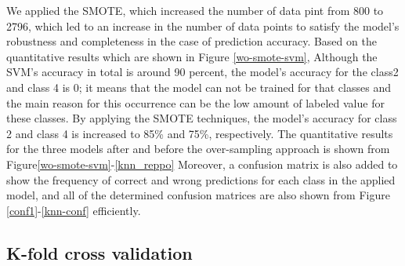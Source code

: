 \documentclass{article}
\begin{document}



We applied the SMOTE, which increased the number of data pint from 800 to 2796, which led to an increase in the number of data points to satisfy the model's robustness and completeness in the case of prediction accuracy. Based on the quantitative results which are shown in Figure \ref{wo-smote-svm}, Although the SVM's accuracy in total is around 90 percent, the model's accuracy for the class2 and class 4 is 0; it means that the model can not be trained for that classes and the main reason for this occurrence can be the low amount of labeled value for these classes. By applying the SMOTE techniques, the model's accuracy for class 2 and class 4 is increased to 85\% and 75\%,  respectively. The quantitative results for the three models after and before the over-sampling approach is shown from Figure\ref{wo-smote-svm}-\ref{knn_reppo}
Moreover, a confusion matrix is also added to show the frequency of correct and wrong predictions for each class in the applied model, and all of the determined confusion matrices are also shown from Figure \ref{conf1}-\ref{knn-conf} efficiently.

\subsection{K-fold cross validation}
\end{document}
